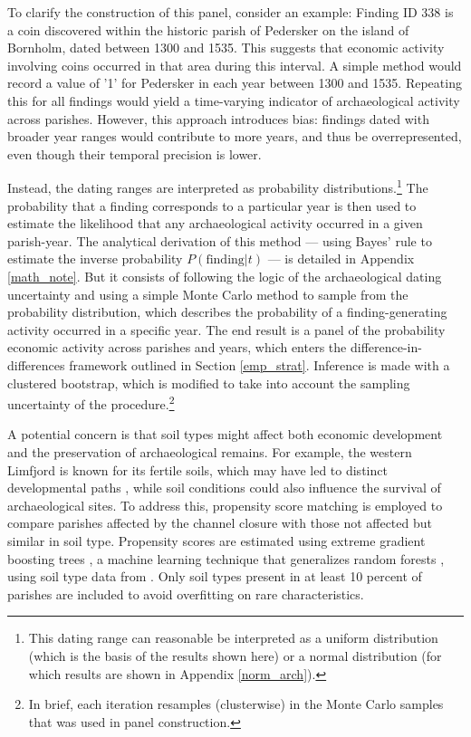 \documentclass[12pt]{article}
\begin{document}
To clarify the construction of this panel, consider an example: Finding ID 338 is a coin discovered within the historic parish of Pedersker on the island of Bornholm, dated between 1300 and 1535. This suggests that economic activity involving coins occurred in that area during this interval. A simple method would record a value of '1' for Pedersker in each year between 1300 and 1535. Repeating this for all findings would yield a time-varying indicator of archaeological activity across parishes. However, this approach introduces bias: findings dated with broader year ranges would contribute to more years, and thus be overrepresented, even though their temporal precision is lower.

Instead, the dating ranges are interpreted as probability distributions.\footnote{This dating range can reasonable be interpreted as a uniform distribution (which is the basis of the results shown here) or a normal distribution (for which results are shown in Appendix \ref{norm_arch}).} The probability that a finding corresponds to a particular year is then used to estimate the likelihood that any archaeological activity occurred in a given parish-year. The analytical derivation of this method — using Bayes’ rule to estimate the inverse probability $P(\text{finding}|t)$ — is detailed in Appendix \ref{math_note}. But it consists of following the logic of the archaeological dating uncertainty and using a simple Monte Carlo method to sample from the probability distribution, which describes the probability of a finding-generating activity occurred in a specific year. The end result is a panel of the probability economic activity across parishes and years, which enters the difference-in-differences framework outlined in Section \ref{emp_strat}. Inference is made with a clustered bootstrap, which is modified to take into account the sampling uncertainty of the procedure.\footnote{In brief, each iteration resamples (clusterwise) in the Monte Carlo samples that was used in panel construction.}

A potential concern is that soil types might affect both economic development and the preservation of archaeological remains. For example, the western Limfjord is known for its fertile soils, which may have led to distinct developmental paths \citep{HeavyPlough2016, WinnersAndLosers2022}, while soil conditions could also influence the survival of archaeological sites. To address this, propensity score matching is employed to compare parishes affected by the channel closure with those not affected but similar in soil type. Propensity scores are estimated using extreme gradient boosting trees \citep{chen2016xgboost}, a machine learning technique that generalizes random forests \citep{Breiman2001}, using soil type data from \citep{Pedersen2019}. Only soil types present in at least 10 percent of parishes are included to avoid overfitting on rare characteristics. 
\end{document}
